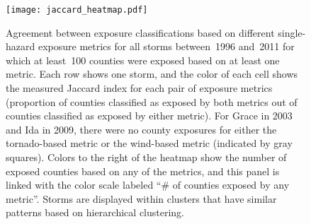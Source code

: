 \clearpage

\begin{figure}%
	\centering 
	\texttt{[image: jaccard\_heatmap.pdf]}
	\caption{Agreement between exposure classifications based on different
	single-hazard exposure metrics for all storms between~1996 and~2011 for
	which at least~100 counties were exposed based on at least one metric.
	Each row shows one storm, and the color of each cell shows the measured
	Jaccard index for each pair of exposure metrics (proportion of counties
	classified as exposed by both metrics out of counties classified as
	exposed by either metric). For Grace in 2003 and Ida in 2009, there
	were no county exposures for either the tornado-based metric or the
	wind-based metric (indicated by gray squares). Colors to the right of
	the heatmap show the number of exposed counties based on any of the
	metrics, and this panel is linked with the color scale labeled ``\# of
	counties exposed by any metric''. Storms are displayed within clusters
	that have similar patterns based on hierarchical clustering.}
\label{fig:jaccard} 
\end{figure}


\begin{comment}
\clearpage

\begin{figure*}%
\centering
\texttt{[image: topelecdependexposure]}
\caption{Study counties with the highest expected rate of physical exposure per year among
	 electricity-dependent Medicare beneficiaries based on each exposure metric. 
	 The color of each bar indicates the number of Medicare beneficiaries in the 
	 county reliant on electricity-dependent medical and assistive equipment as 
	 of July~2017. The length of each bar shows the average expected rate of physical exposure
	 to tropical cyclones among this population based on a given exposure metric, i.e., 
	 the expected number of these electricity-dependent Medicare beneficiaries exposed 
	 to tropical storms per year based on that metric (Table 1).}
\label{fig:topelecdependexposure}
\end{figure*}

\end{comment}
